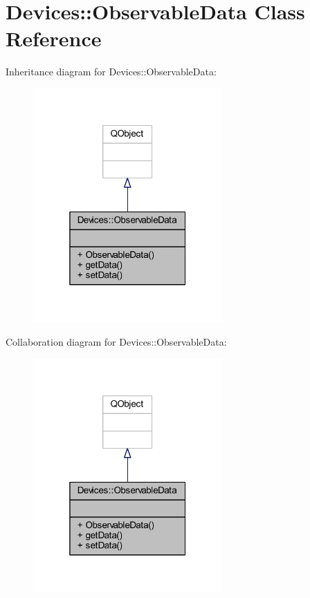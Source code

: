 \hypertarget{class_devices_1_1_observable_data}{}\section{Devices\+:\+:Observable\+Data Class Reference}
\label{class_devices_1_1_observable_data}


Inheritance diagram for Devices\+:\+:Observable\+Data\+:\nopagebreak
\begin{figure}[H]
\begin{center}
\leavevmode
\includegraphics[width=205pt]{da/db4/class_devices_1_1_observable_data__inherit__graph}
\end{center}
\end{figure}


Collaboration diagram for Devices\+:\+:Observable\+Data\+:\nopagebreak
\begin{figure}[H]
\begin{center}
\leavevmode
\includegraphics[width=205pt]{d2/d78/class_devices_1_1_observable_data__coll__graph}
\end{center}
\end{figure}

